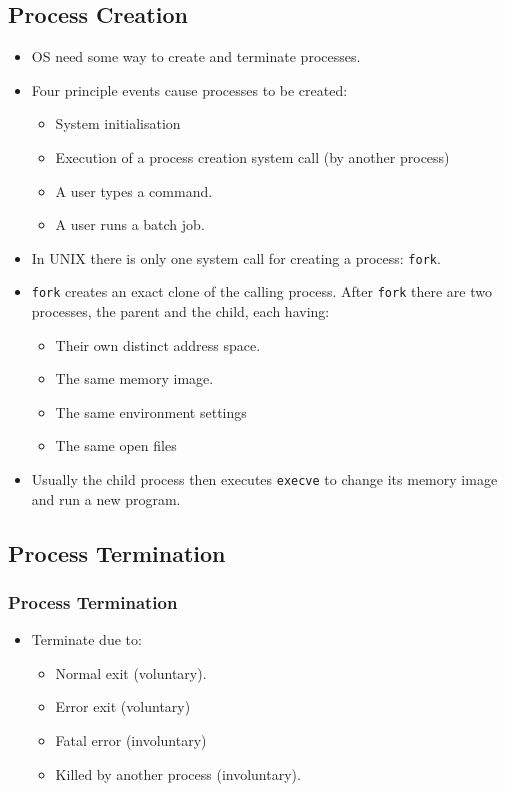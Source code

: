 \documentclass{beamer}
\begin{document}
\subsection{Process Creation}
\begin{itemize}
\item OS need some way to create and terminate processes.
\item Four principle events cause processes to be created:
\begin{itemize}
\item System initialisation
\item Execution of a process creation system call (by another process)
\item A user types a command.
\item A user runs a batch job.
\end{itemize}
\item In UNIX there is only one system call for creating a process: \texttt{fork}.
\item \texttt{fork} creates an exact clone of the calling process. After \texttt{fork} there are two processes, the parent and the child, each having:
\begin{itemize}
\item Their own {\color{red}distinct address space}.
\item The same {\color{green}memory image}.
\item The same {\color{purple}environment settings}
\item The same {\color{orange}open files}
\end{itemize}
\item Usually the child process then executes \texttt{execve} to change its memory image and run a new program.
\end{itemize}
\subsection{Process Termination}
\begin{frame}
\frametitle{Process Termination}
\begin{itemize}
\item Terminate due to:
\begin{itemize}
\item Normal exit (voluntary).
\item Error exit (voluntary)
\item Fatal error (involuntary)
\item Killed by another process (involuntary). 
\end{itemize}
\end{itemize}
\end{frame}
\end{document}
